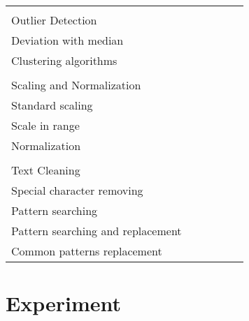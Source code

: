 \documentclass[sigconf]{acmart}
\begin{document}
\begin{table*}
\begin{tabular}{lccccc}
&&&&& \\
Outlier Detection &&&&& \\
\hline
Deviation with median			&						& 			& \checkmark		&							&			\\
Clustering algorithms			&						& \checkmark	& 				&							&			\\	
	
&&&&& \\
Scaling and Normalization &&&&& \\
\hline
Standard scaling				&						& \checkmark	& 				&							& \checkmark	\\		
Scale in range				&						& \checkmark	& \checkmark		&							& \checkmark	\\
Normalization				&						& \checkmark	& \checkmark		&							& 			\\



&&&&& \\
Text Cleaning &&&&& \\
\hline
Special character removing		& \checkmark				& \checkmark	& \checkmark		&							&		\\
Pattern searching 			 	& \checkmark				& \checkmark	& \checkmark		&							&		\\		
Pattern searching and replacement 	&						& \checkmark	& \checkmark		&							&		\\
Common patterns replacement		&						& \checkmark	&				&							& 		\\
\end{tabular}
\end{table*}


\section{Experiment}
\end{document}
